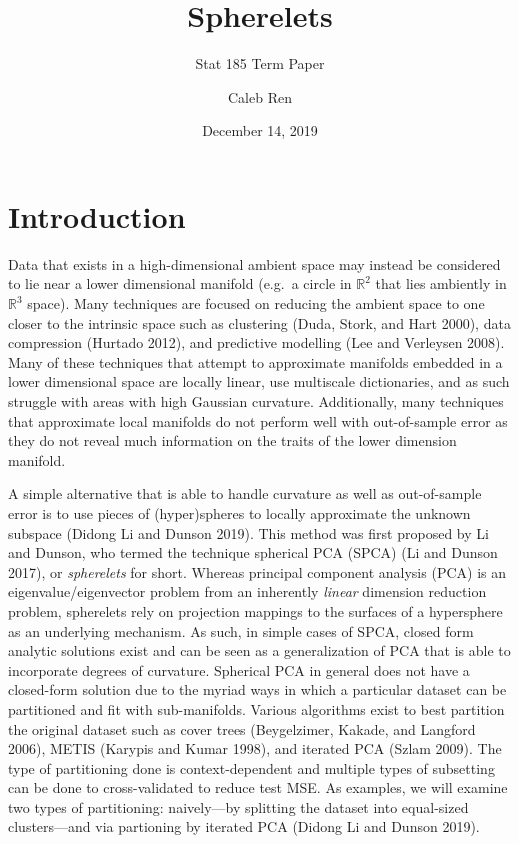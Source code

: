 \documentclass[]{article}
\title{Spherelets}
\subtitle{Stat 185 Term Paper}
\author{Caleb Ren}
\date{December 14, 2019}
\begin{document}
\maketitle

{
\setcounter{tocdepth}{2}
\tableofcontents
}
\newpage

\section{Introduction}

Data that exists in a high-dimensional ambient space may instead be
considered to lie near a lower dimensional manifold (e.g.~a circle in
\(\mathbb{R}^2\) that lies ambiently in \(\mathbb{R}^3\) space). Many
techniques are focused on reducing the ambient space to one closer to
the intrinsic space such as clustering (Duda, Stork, and Hart 2000),
data compression (Hurtado 2012), and predictive modelling (Lee and
Verleysen 2008). Many of these techniques that attempt to approximate
manifolds embedded in a lower dimensional space are locally linear, use
multiscale dictionaries, and as such struggle with areas with high
Gaussian curvature. Additionally, many techniques that approximate local
manifolds do not perform well with out-of-sample error as they do not
reveal much information on the traits of the lower dimension manifold.

A simple alternative that is able to handle curvature as well as
out-of-sample error is to use pieces of (hyper)spheres to locally
approximate the unknown subspace (Didong Li and Dunson 2019). This
method was first proposed by Li and Dunson, who termed the technique
spherical PCA (SPCA) (Li and Dunson 2017), or \emph{spherelets} for
short. Whereas principal component analysis (PCA) is an
eigenvalue/eigenvector problem from an inherently \emph{linear}
dimension reduction problem, spherelets rely on projection mappings to
the surfaces of a hypersphere as an underlying mechanism. As such, in
simple cases of SPCA, closed form analytic solutions exist and can be
seen as a generalization of PCA that is able to incorporate degrees of
curvature. Spherical PCA in general does not have a closed-form solution
due to the myriad ways in which a particular dataset can be partitioned
and fit with sub-manifolds. Various algorithms exist to best partition
the original dataset such as cover trees (Beygelzimer, Kakade, and
Langford 2006), METIS (Karypis and Kumar 1998), and iterated PCA (Szlam
2009). The type of partitioning done is context-dependent and multiple
types of subsetting can be done to cross-validated to reduce test MSE.
As examples, we will examine two types of partitioning: naively---by
splitting the dataset into equal-sized clusters---and via partioning by
iterated PCA (Didong Li and Dunson 2019).
\end{document}
